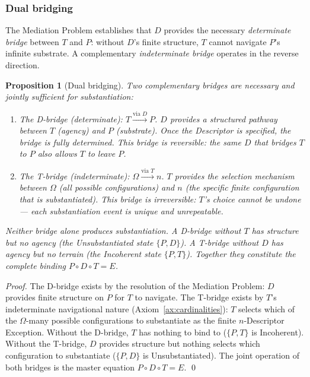 \documentclass[11pt,a4paper]{article}
\newtheorem{proposition}[theorem]{Proposition}
\theoremstyle{definition}
\theoremstyle{remark}
\begin{document}
\subsubsection{Dual bridging}\label{subsubsec:dual-bridging}

The Mediation Problem establishes that $D$ provides the necessary \emph{determinate bridge} between $T$ and $P$: without $D$'s finite structure, $T$ cannot navigate $P$'s infinite substrate. A complementary \emph{indeterminate bridge} operates in the reverse direction.

\begin{proposition}[Dual bridging]\label{prop:dual-bridging}
Two complementary bridges are necessary and jointly sufficient for substantiation:
\begin{enumerate}[label=(\roman*),leftmargin=*]
\item The \emph{D-bridge} (determinate): $T \xrightarrow{\text{via } D} P$. $D$ provides a structured pathway between $T$ (agency) and $P$ (substrate). Once the Descriptor is specified, the bridge is fully determined. This bridge is reversible: the same $D$ that bridges $T$ to $P$ also allows $T$ to leave $P$.
\item The \emph{T-bridge} (indeterminate): $\Omega \xrightarrow{\text{via } T} n$. $T$ provides the selection mechanism between $\Omega$ (all possible configurations) and $n$ (the specific finite configuration that is substantiated). This bridge is irreversible: $T$'s choice cannot be undone --- each substantiation event is unique and unrepeatable.
\end{enumerate}
Neither bridge alone produces substantiation. A D-bridge without $T$ has structure but no agency (the Unsubstantiated state $\{P,D\}$). A T-bridge without $D$ has agency but no terrain (the Incoherent state $\{P,T\}$). Together they constitute the complete binding $P \circ D \circ T = E$.
\end{proposition}

\begin{proof}
The D-bridge exists by the resolution of the Mediation Problem: $D$ provides finite structure on $P$ for $T$ to navigate. The T-bridge exists by $T$'s indeterminate navigational nature (Axiom~\ref{ax:cardinalities}): $T$ selects which of the $\Omega$-many possible configurations to substantiate as the finite $n$-Descriptor Exception. Without the D-bridge, $T$ has nothing to bind to ($\{P,T\}$ is Incoherent). Without the T-bridge, $D$ provides structure but nothing selects which configuration to substantiate ($\{P,D\}$ is Unsubstantiated). The joint operation of both bridges is the master equation $P \circ D \circ T = E$. \qed
\end{proof}
\end{document}
